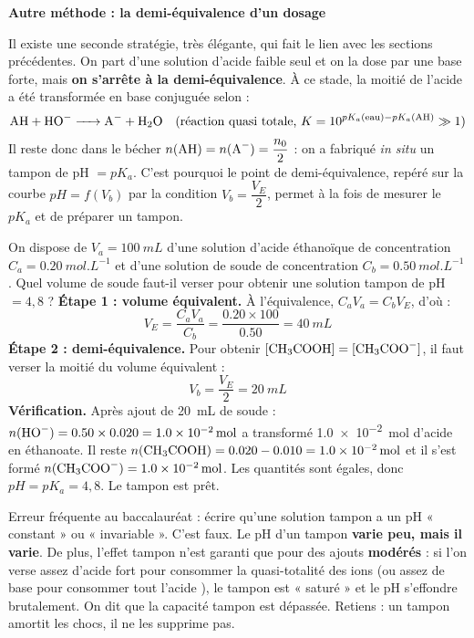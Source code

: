 \documentclass[11pt]{article}
\newcommand{\cle}[1]{{\popxbold\color{popdark}#1}}
\begin{document}
\textbf{Autre méthode : la demi-équivalence d'un dosage}\par

Il existe une seconde stratégie, très élégante, qui fait le lien avec les sections précédentes. On part d'une solution d'acide faible seul et on la dose par une base forte, mais \textbf{on s'arrête à la demi-équivalence}. À ce stade, la moitié de l'acide a été transformée en base conjuguée selon :
\[ \ce{AH + HO- -> A- + H2O} \quad\text{(réaction quasi totale, } K = 10^{pK_a(\text{eau}) - pK_a(\ce{AH})} \gg 1\text{)} \]
Il reste donc dans le bécher $n(\ce{AH}) = n(\ce{A-}) = \dfrac{n_0}{2}$ : on a fabriqué \emph{in situ} un tampon de pH $= pK_a$. C'est pourquoi le point de demi-équivalence, repéré sur la courbe $pH = f(V_b)$ par la condition $V_b = \dfrac{V_E}{2}$, permet à la fois de mesurer le $pK_a$ et de préparer un tampon.

\begin{exoresolu}
On dispose de $V_a = \SI{100}{mL}$ d'une solution d'acide éthanoïque de concentration $C_a = \SI{0,20}{mol.L^{-1}}$ et d'une solution de soude de concentration $C_b = \SI{0,50}{mol.L^{-1}}$. Quel volume de soude faut-il verser pour obtenir une solution tampon de pH $= 4{,}8$ ?
\tcblower
\textbf{Étape 1 : volume équivalent.} À l'équivalence, $C_a V_a = C_b V_E$, d'où :
\[ V_E = \frac{C_a V_a}{C_b} = \frac{\num{0,20} \times \num{100}}{\num{0,50}} = \SI{40}{mL} \]
\textbf{Étape 2 : demi-équivalence.} Pour obtenir $[\ce{CH3COOH}] = [\ce{CH3COO-}]$, il faut verser la moitié du volume équivalent :
\[ V_b = \frac{V_E}{2} = \SI{20}{mL} \]
\textbf{Vérification.} Après ajout de \SI{20}{mL} de soude : $n(\ce{HO-}) = \num{0,50} \times \num{0,020} = \SI{1,0e-2}{mol}$ a transformé \SI{1,0e-2}{mol} d'acide en éthanoate. Il reste $n(\ce{CH3COOH}) = \num{0,020} - \num{0,010} = \SI{1,0e-2}{mol}$ et il s'est formé $n(\ce{CH3COO-}) = \SI{1,0e-2}{mol}$. Les quantités sont égales, donc $pH = pK_a = 4{,}8$. Le tampon est prêt.
\end{exoresolu}

\begin{attention}
Erreur fréquente au baccalauréat : écrire qu'une solution tampon a un pH « constant » ou « invariable ». C'est faux. Le pH d'un tampon \textbf{varie peu, mais il varie}. De plus, l'effet tampon n'est garanti que pour des ajouts \textbf{modérés} : si l'on verse assez d'acide fort pour consommer la quasi-totalité des ions  (ou assez de base pour consommer tout l'acide ), le tampon est « saturé » et le pH s'effondre brutalement. On dit que la \cle{capacité tampon} est dépassée. Retiens : un tampon amortit les chocs, il ne les supprime pas.
\end{attention}
\end{document}
